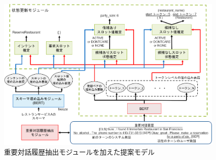 \begin{figure}[thb]
  \centering
  \includegraphics[width=15cm]{chapter4/teian.eps}
  \caption{重要対話履歴抽出モジュールを加えた提案モデル}
  \label{fig:teian}
\end{figure}

